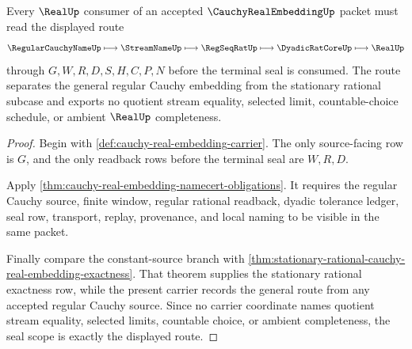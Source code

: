 \begin{theorem}
\label{thm:cauchy-real-embedding-real-seal-scope}
Every $\RealUp$ consumer of an accepted $\CauchyRealEmbeddingUp$ packet must read the displayed route
$$
\RegularCauchyNameUp \longmapsto \StreamNameUp \longmapsto \RegSeqRatUp \longmapsto \DyadicRatCoreUp \longmapsto \RealUp
$$
through $G,W,R,D,S,H,C,P,N$ before the terminal seal is consumed. The route separates the general regular Cauchy embedding from the stationary rational subcase and exports no quotient stream equality, selected limit, countable-choice schedule, or ambient $\RealUp$ completeness.
\end{theorem}
\begin{proof}
Begin with \autoref{def:cauchy-real-embedding-carrier}. The only source-facing row is $G$, and the only readback rows before the terminal seal are $W,R,D$.

Apply \autoref{thm:cauchy-real-embedding-namecert-obligations}. It requires the regular Cauchy source, finite window, regular rational readback, dyadic tolerance ledger, seal row, transport, replay, provenance, and local naming to be visible in the same packet.

Finally compare the constant-source branch with \autoref{thm:stationary-rational-cauchy-real-embedding-exactness}. That theorem supplies the stationary rational exactness row, while the present carrier records the general route from any accepted regular Cauchy source. Since no carrier coordinate names quotient stream equality, selected limits, countable choice, or ambient completeness, the seal scope is exactly the displayed route.
\end{proof}




